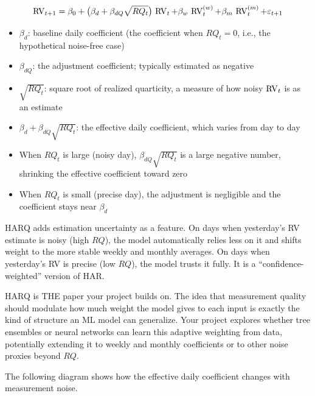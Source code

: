 \begin{equation}
  \operatorname{RV}_{t+1} = \beta_0 + \bigl(\beta_d + \beta_{dQ}\sqrt{RQ_t}\bigr)\,\operatorname{RV}_t
             + \beta_w \, \operatorname{RV}^{(w)}_t + \beta_m \, \operatorname{RV}^{(m)}_t + \varepsilon_{t+1}
  \label{eq:harq}
\end{equation}
\begin{itemize}[nosep]
  \item $\beta_d$: baseline daily coefficient (the coefficient when $RQ_t = 0$, i.e., the hypothetical noise-free case)
  \item $\beta_{dQ}$: the adjustment coefficient; typically estimated as negative
  \item $\sqrt{RQ_t}$: square root of realized quarticity, a measure of how noisy $\operatorname{RV}_t$ is as an estimate
  \item $\beta_d + \beta_{dQ}\sqrt{RQ_t}$: the effective daily coefficient, which varies from day to day
  \item When $RQ_t$ is large (noisy day), $\beta_{dQ}\sqrt{RQ_t}$ is a large negative number, shrinking the effective coefficient toward zero
  \item When $RQ_t$ is small (precise day), the adjustment is negligible and the coefficient stays near $\beta_d$
\end{itemize}

\begin{intuition}
HARQ adds estimation uncertainty as a feature.
On days when yesterday's RV estimate is noisy (high $RQ$), the model automatically relies less on it and shifts weight to the more stable weekly and monthly averages.
On days when yesterday's RV is precise (low $RQ$), the model trusts it fully.
It is a ``confidence-weighted'' version of HAR.
\end{intuition}

\begin{projectconnection}
HARQ is THE paper your project builds on.
The idea that measurement quality should modulate how much weight the model gives to each input is exactly the kind of structure an ML model can generalize.
Your project explores whether tree ensembles or neural networks can learn this adaptive weighting from data, potentially extending it to weekly and monthly coefficients or to other noise proxies beyond $RQ$.
\end{projectconnection}

The following diagram shows how the effective daily coefficient changes with measurement noise.

